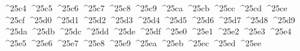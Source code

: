 {  ^^^^25c4%
  ^^^^25c5%
  ^^^^25c6%
  ^^^^25c7%
  ^^^^25c8%
  ^^^^25c9%
  ^^^^25ca%
  ^^^^25cb%
  ^^^^25cc%
  ^^^^25cd%
  ^^^^25ce%
  ^^^^25cf%
  ^^^^25d0%
  ^^^^25d1%
  ^^^^25d2%
  ^^^^25d3%
  ^^^^25d4%
  ^^^^25d5%
  ^^^^25d6%
  ^^^^25d7%
  ^^^^25d8%
  ^^^^25d9%
  ^^^^25da%
  ^^^^25db%
  ^^^^25dc%
  ^^^^25dd%
  ^^^^25de%
  ^^^^25df%
  ^^^^25e0%
  ^^^^25e1%
  ^^^^25e2%
  ^^^^25e3%
  ^^^^25e4%
  ^^^^25e5%
  ^^^^25e6%
  ^^^^25e7%
  ^^^^25e8%
  ^^^^25e9%
  ^^^^25ea%
  ^^^^25eb%
  ^^^^25ec%
  ^^^^25ed%
  ^^^^25ee%
}
